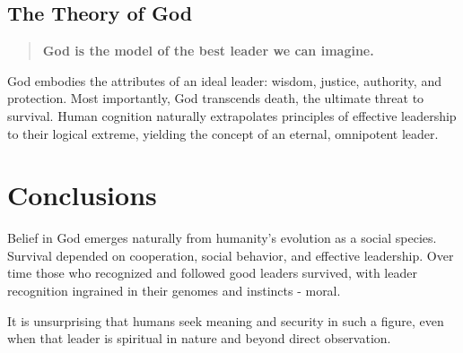 \subsection*{The Theory of God}

\begin{quote}
\textbf{God is the model of the best leader we can imagine.}
\end{quote}

God embodies the attributes of an ideal leader: wisdom, justice, authority, and protection. Most importantly, God transcends death, the ultimate threat to survival. Human cognition naturally extrapolates principles of effective leadership to their logical extreme, yielding the concept of an eternal, omnipotent leader.

\section{Conclusions}

Belief in God emerges naturally from humanity’s evolution as a social species. Survival depended on cooperation, social behavior, and effective leadership.
Over time those who recognized and followed good leaders survived, with leader recognition ingrained in their genomes and instincts - moral.

It is unsurprising that humans seek meaning and security in such a figure, even when that leader is spiritual in nature and beyond direct observation.

